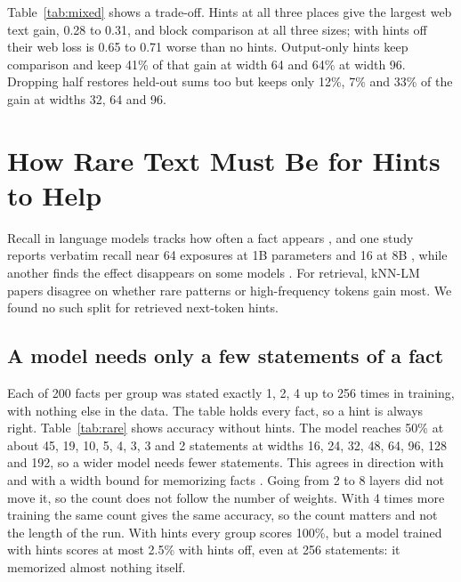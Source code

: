 \documentclass[11pt]{article}
\begin{document}
Table~\ref{tab:mixed} shows a trade-off. Hints at all three places give the largest web text gain, 0.28 to 0.31, and block comparison at all three sizes; with hints off their web loss is 0.65 to 0.71 worse than no hints. Output-only hints keep comparison and keep 41\% of that gain at width 64 and 64\% at width 96. Dropping half restores held-out sums too but keeps only 12\%, 7\% and 33\% of the gain at widths 32, 64 and 96.

\section{How Rare Text Must Be for Hints to Help}
Recall in language models tracks how often a fact appears \cite{kandpal,olmotrace}, and one study reports verbatim recall near 64 exposures at 1B parameters and 16 at 8B \cite{position}, while another finds the effect disappears on some models \cite{memcontext}. For retrieval, kNN-LM papers disagree on whether rare patterns \cite{knnlm} or high-frequency tokens \cite{knnlong} gain most. We found no such split for retrieved next-token hints.

\subsection{A model needs only a few statements of a fact}
Each of 200 facts per group was stated exactly 1, 2, 4 up to 256 times in training, with nothing else in the data. The table holds every fact, so a hint is always right. Table~\ref{tab:rare} shows accuracy without hints. The model reaches 50\% at about 45, 19, 10, 5, 4, 3, 3 and 2 statements at widths 16, 24, 32, 48, 64, 96, 128 and 192, so a wider model needs fewer statements. This agrees in direction with \cite{position} and with a width bound for memorizing facts \cite{geometric}. Going from 2 to 8 layers did not move it, so the count does not follow the number of weights. With 4 times more training the same count gives the same accuracy, so the count matters and not the length of the run. With hints every group scores 100\%, but a model trained with hints scores at most 2.5\% with hints off, even at 256 statements: it memorized almost nothing itself.
\end{document}
